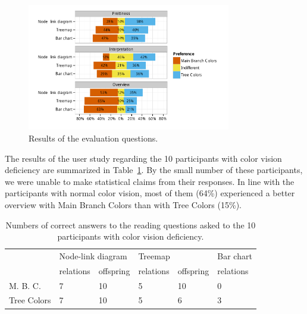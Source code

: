 \documentclass[journal]{vgtc}                %
\begin{document}
\begin{figure}[!t]
  \centering
	\includegraphics[width=3.5in]{user_study_results2.pdf}
  \caption{Results of the evaluation questions.}\label{fig:user2}
    \vspace{-2ex}

\end{figure}



The results of the user study regarding the 10 participants with color vision deficiency are summarized in Table~\ref{table:userCB}. By the small number of these participants, we were unable to make statistical claims from their responses. In line with the participants with normal color vision, most of them (64\%) experienced a better overview with Main Branch Colors than with Tree Colors (15\%).

\begin{table}[!htb]
\begin{footnotesize}
\begin{center}
\begin{tabular}{llllll}
\toprule
& \multicolumn{2}{l}{Node-link diagram} & \multicolumn{2}{l}{Treemap} & Bar chart\\
& relations & offspring & relations & offspring & relations\\
\midrule
M. B. C. & 7 & 10 & 5 & 10 & 0\\
Tree Colors & 7 & 10 & 5 & 6 & 3\\
\bottomrule
\end{tabular}
    \vspace{-2ex}

\end{center}
\end{footnotesize}
\caption{Numbers of correct answers to the reading questions asked to the 10 participants with color vision deficiency.}\label{table:userCB}
    \vspace{-2ex}
\end{table}
\end{document}

